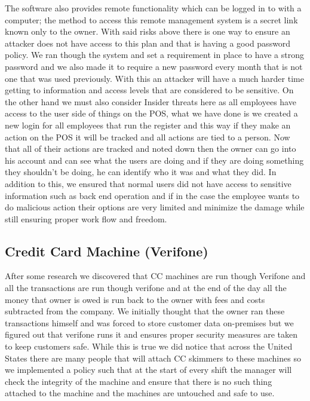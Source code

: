 \documentclass[11pt]{article}
\begin{document}
The software also provides remote functionality which can be logged in to with a computer; the method to access this remote management system is a secret link known only to the owner. With said risks above there is one way to ensure an attacker does not have access to this plan and that is having a good password policy. We ran though the system and set a requirement in place to have a strong password and we also made it to require a new password every month that is not one that was used previously. With this an attacker will have a much harder time getting to information and access levels that are considered to be sensitive. On the other hand we must also consider Insider threats here as all employees have access to the user side of things on the POS, what we have done is we created a new login for all employees that run the register and this way if they make an action on the POS it will be tracked and all actions are tied to a person. Now that all of their actions are tracked and noted down then the owner can go into his account and can see what the users are doing and if they are doing something they shouldn't be doing, he can identify who it was and what they did. In addition to this, we ensured that normal users did not have access to sensitive information such as back end operation and if in the case the employee wants to do malicious action their options are very limited and minimize the damage while still ensuring proper work flow and freedom.

\subsection{Credit Card Machine (Verifone)}
\label{sec:org223abf7}
After some research we discovered that CC machines are run though Verifone and all the transactions are run though verifone and at the end of the day all the money that owner is owed is run back to the owner with fees and costs subtracted from the company. We initially thought that the owner ran these transactions himself and was forced to store customer data on-premises but we figured out that verifone runs it and ensures proper security measures are taken to keep customers safe. While this is true we did notice that across the United States there are many people that will attach CC skimmers to these machines so we implemented a policy such that at the start of every shift the manager will check the integrity of the machine and ensure that there is no such thing attached to the machine and the machines are untouched and safe to use.
\end{document}
